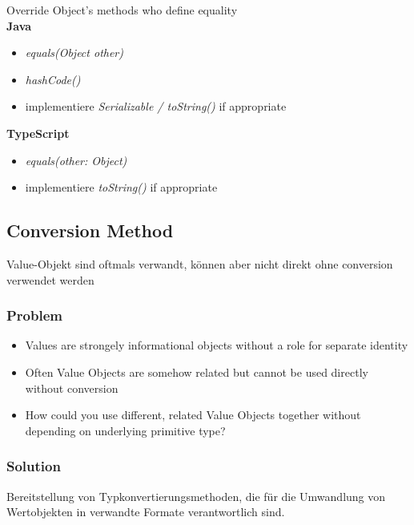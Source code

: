 Override Object's methods who define equality \\

\textbf{Java}
\begin{itemize}
    \item \textit{equals(Object other)}
    \item \textit{hashCode()}
    \item implementiere \textit{Serializable / toString()} if appropriate
\end{itemize}
\vspace{10pt}
\textbf{TypeScript}
\begin{itemize}
    \item \textit{equals(other: Object)}
    \item implementiere \textit{toString()} if appropriate
\end{itemize}

\subsection{Conversion Method}

Value-Objekt sind oftmals verwandt, können aber nicht direkt ohne conversion verwendet werden

\subsubsection{Problem}
\begin{itemize}
    \item Values are strongely informational objects without a role for separate identity
    \item Often Value Objects are somehow related but cannot be used directly without conversion
    \item How could you use different, related Value Objects together without depending on underlying primitive type?
\end{itemize}

\subsubsection{Solution}
Bereitstellung von Typkonvertierungsmethoden, die für die Umwandlung von Wertobjekten in verwandte Formate verantwortlich sind.

